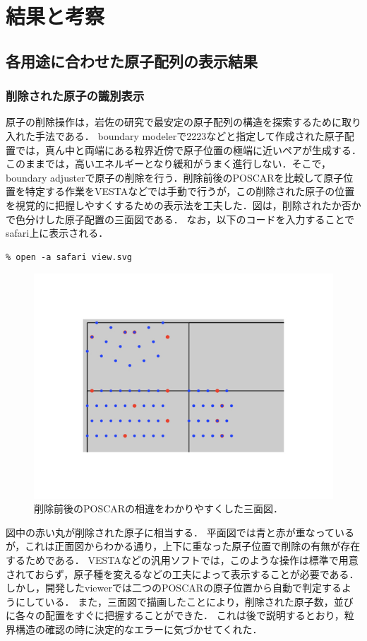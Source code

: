 
\section{結果と考察}
\subsection{各用途に合わせた原子配列の表示結果}
\subsubsection{削除された原子の識別表示}
原子の削除操作は，岩佐の研究で最安定の原子配列の構造を探索するために取り入れた手法である．
boundary modelerで2223などと指定して作成された原子配置では，真ん中と両端にある粒界近傍で原子位置の極端に近いペアが生成する．このままでは，高いエネルギーとなり緩和がうまく進行しない．そこで，boundary adjusterで原子の削除を行う．削除前後のPOSCARを比較して原子位置を特定する作業をVESTAなどでは手動で行うが，この削除された原子の位置を視覚的に把握しやすくするための表示法を工夫した．図は，削除されたか否かで色分けした原子配置の三面図である．
なお，以下のコードを入力することでsafari上に表示される．
\begin{lstlisting}[style=customCsh,basicstyle={\scriptsize\ttfamily}]
% ruby viewer.rb POSCAR_2223 POSCAR_2223_4
% open -a safari view.svg 
\end{lstlisting}
\begin{figure}[htbp]\begin{center}
\includegraphics[width=12cm,bb= 0 0 937 753]{../figs/./boundary_narita.010.jpeg}
\caption{削除前後のPOSCARの相違をわかりやすくした三面図．}
\label{default}\end{center}\end{figure}
図中の赤い丸が削除された原子に相当する．
平面図では青と赤が重なっているが，これは正面図からわかる通り，上下に重なった原子位置で削除の有無が存在するためである．
VESTAなどの汎用ソフトでは，このような操作は標準で用意されておらず，原子種を変えるなどの工夫によって表示することが必要である．
しかし，開発したviewerでは二つのPOSCARの原子位置から自動で判定するようにしている．
また，三面図で描画したことにより，削除された原子数，並びに各々の配置をすぐに把握することができた．
これは後で説明するとおり，粒界構造の確認の時に決定的なエラーに気づかせてくれた．

